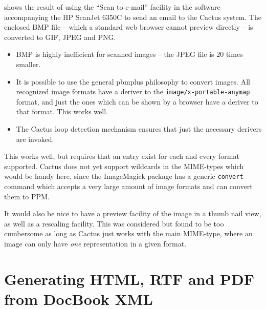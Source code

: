  shows the result of using the ``Scan to
e-mail'' facility in the software accompanying the HP ScanJet 6350C to
send an email to the Cactus system.  The enclosed BMP file -- which a
standard web browser cannot preview directly -- is converted to GIF,
JPEG and PNG.


\begin{itemize}
\item BMP is highly inefficient for scanned images -- the JPEG file is 20
  times smaller.

\item It is possible to use the general pbmplus philosophy to convert
  images.  All recognized image formats have a deriver to the
  \texttt{image/x-portable-anymap} format, and just the ones which can be
  shown by a browser have a deriver to that format.   This works well.
\item The Cactus loop detection mechanism ensures that just the
  necessary derivers are invoked.
\end{itemize}

This works well, but requires that an entry exist for each and every
format supported.  Cactus does not yet support wildcards in the
MIME-types which would be handy here, since the ImageMagick package
has a generic \texttt{convert} command which accepts a very large
amount of image formats and can convert them to PPM.

It would also be nice to have a preview facility of the image in a
thumb nail view, as well as a rescaling facility.  This was considered
but found to be too cumbersome as long as Cactus just works with the
main MIME-type, where an image can only have \textit{one}
representation in a given format.

\section{Generating HTML, RTF and PDF from DocBook XML}
\label{sec:xml-publishing}





